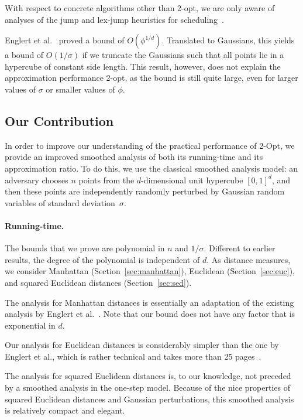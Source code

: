 \documentclass[11pt,DIV=12,a4paper]{scrartcl}
\begin{document}
With respect to concrete algorithms other than 2-opt, we are only aware of analyses of the jump and lex-jump heuristics for scheduling~\cite{BrunschEA:Scheduling:2014,Etscheid15}.

Englert et al.~\cite{EnglertEA:2Opt:2014} proved a bound of $O(\phi^{1/d})$. Translated to Gaussians,
this yields a bound of $O(1/\sigma)$ if we truncate the Gaussians such that all points
lie in a hypercube of constant side length.
This result, however, does not explain the approximation performance 2-opt, as the
bound is still quite large, even for larger values of $\sigma$ or smaller values of $\phi$.

\subsection{Our Contribution}

In order to improve our understanding of the practical performance of 2-Opt, we provide an improved smoothed analysis
of both its running-time and its approximation ratio. To do this, we use the classical smoothed
analysis model: an adversary chooses $n$ points from the $d$-dimensional unit hypercube $[0,1]^d$, and then these points are independently
randomly perturbed by Gaussian random variables of standard deviation~$\sigma$.


\paragraph{Running-time.}

The bounds that we prove are polynomial in $n$ and $1/\sigma$.
Different to earlier results, the degree of the polynomial is independent of $d$. As distance measures, we
consider Manhattan (Section~\ref{sec:manhattan}), Euclidean
(Section~\ref{sec:euc}), and
squared Euclidean distances (Section~\ref{sec:sed}).

The analysis for Manhattan distances is essentially an adaptation of the existing analysis
by Englert et al.~\cite[Section 4.1]{EnglertEA:2Opt:2014}. Note that our bound does not have any factor that is exponential in $d$.

Our analysis for Euclidean distances is considerably
simpler than the one by Englert et al., which is rather technical and takes more than 25
pages~\cite[Section~4.2 and Appendix~C]{EnglertEA:2Opt:2014}.

The analysis for squared Euclidean distances is, to our knowledge, not preceded by a smoothed analysis in the one-step
model. Because of the nice properties of squared Euclidean distances and Gaussian perturbations,
this smoothed analysis is relatively compact and elegant.
\end{document}
